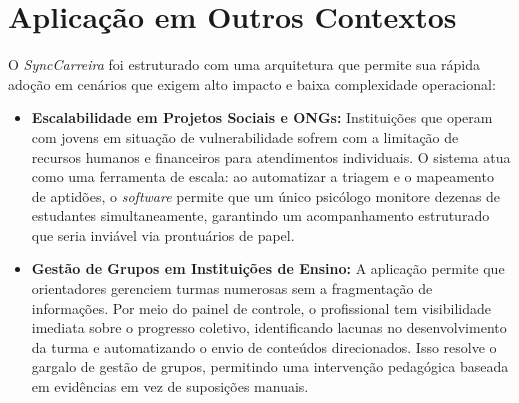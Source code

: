 \section{Aplicação em Outros Contextos}

O \textit{SyncCarreira} foi estruturado com uma arquitetura que permite sua rápida adoção em cenários que exigem alto impacto e baixa complexidade operacional:

\begin{itemize}
    \item \textbf{Escalabilidade em Projetos Sociais e ONGs:} Instituições que operam com jovens em situação de vulnerabilidade sofrem com a limitação de recursos humanos e financeiros para atendimentos individuais. O sistema atua como uma ferramenta de escala: ao automatizar a triagem e o mapeamento de aptidões, o \textit{software} permite que um único psicólogo monitore dezenas de estudantes simultaneamente, garantindo um acompanhamento estruturado que seria inviável via prontuários de papel.

    \item \textbf{Gestão de Grupos em Instituições de Ensino:} A aplicação permite que orientadores gerenciem turmas numerosas sem a fragmentação de informações. Por meio do painel de controle, o profissional tem visibilidade imediata sobre o progresso coletivo, identificando lacunas no desenvolvimento da turma e automatizando o envio de conteúdos direcionados. Isso resolve o gargalo de gestão de grupos, permitindo uma intervenção pedagógica baseada em evidências em vez de suposições manuais.
\end{itemize}
